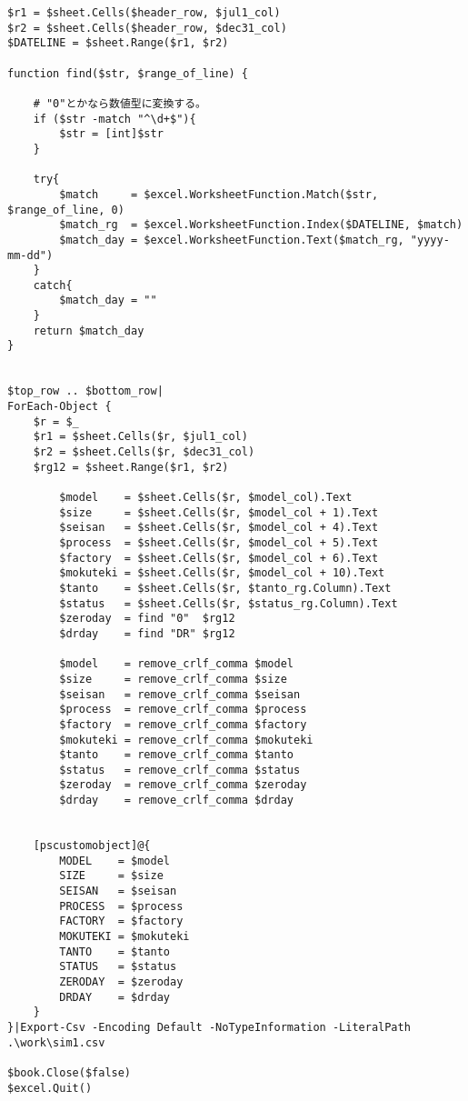 \documentclass[dvipdfmx]{jsarticle}
\begin{document}
\begin{verbatim}
$r1 = $sheet.Cells($header_row, $jul1_col)
$r2 = $sheet.Cells($header_row, $dec31_col)
$DATELINE = $sheet.Range($r1, $r2)

function find($str, $range_of_line) {

    # "0"とかなら数値型に変換する。
    if ($str -match "^\d+$"){
        $str = [int]$str
    }

    try{
        $match     = $excel.WorksheetFunction.Match($str, $range_of_line, 0)
        $match_rg  = $excel.WorksheetFunction.Index($DATELINE, $match)
        $match_day = $excel.WorksheetFunction.Text($match_rg, "yyyy-mm-dd")
    }
    catch{
        $match_day = ""
    }
    return $match_day
}


$top_row .. $bottom_row|
ForEach-Object {
    $r = $_
    $r1 = $sheet.Cells($r, $jul1_col)
    $r2 = $sheet.Cells($r, $dec31_col)
    $rg12 = $sheet.Range($r1, $r2)

        $model    = $sheet.Cells($r, $model_col).Text
        $size     = $sheet.Cells($r, $model_col + 1).Text
        $seisan   = $sheet.Cells($r, $model_col + 4).Text
        $process  = $sheet.Cells($r, $model_col + 5).Text
        $factory  = $sheet.Cells($r, $model_col + 6).Text
        $mokuteki = $sheet.Cells($r, $model_col + 10).Text
        $tanto    = $sheet.Cells($r, $tanto_rg.Column).Text
        $status   = $sheet.Cells($r, $status_rg.Column).Text
        $zeroday  = find "0"  $rg12
        $drday    = find "DR" $rg12

        $model    = remove_crlf_comma $model
        $size     = remove_crlf_comma $size
        $seisan   = remove_crlf_comma $seisan
        $process  = remove_crlf_comma $process
        $factory  = remove_crlf_comma $factory
        $mokuteki = remove_crlf_comma $mokuteki
        $tanto    = remove_crlf_comma $tanto
        $status   = remove_crlf_comma $status
        $zeroday  = remove_crlf_comma $zeroday
        $drday    = remove_crlf_comma $drday


    [pscustomobject]@{
		MODEL    = $model
		SIZE     = $size
		SEISAN   = $seisan
		PROCESS  = $process
		FACTORY  = $factory
		MOKUTEKI = $mokuteki
		TANTO    = $tanto
		STATUS   = $status
		ZERODAY  = $zeroday
		DRDAY    = $drday
    }
}|Export-Csv -Encoding Default -NoTypeInformation -LiteralPath .\work\sim1.csv

$book.Close($false)
$excel.Quit()        

\end{verbatim}

\end{document}
